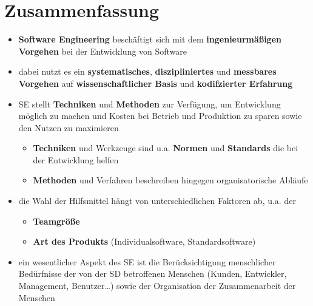\section{Zusammenfassung}

\begin{itemize}
    \item \textbf{Software Engineering} beschäftigt sich mit dem \textbf{ingenieurmäßigen Vorgehen} bei der Entwicklung von Software
    \item dabei nutzt es ein \textbf{systematisches}, \textbf{diszipliniertes} und \textbf{messbares Vorgehen} auf \textbf{wissenschaftlicher Basis} und \textbf{kodifzierter Erfahrung}
    \item SE stellt \textbf{Techniken} und \textbf{Methoden} zur Verfügung, um Entwicklung möglich zu machen und Kosten bei Betrieb und Produktion zu sparen sowie den Nutzen zu maximieren
        \begin{itemize}
            \item \textbf{Techniken} und Werkzeuge sind u.a. \textbf{Normen} und \textbf{Standards} die bei der Entwicklung helfen
            \item \textbf{Methoden} und Verfahren beschreiben hingegen organisatorische Abläufe
        \end{itemize}
    \item die Wahl der Hilfsmittel hängt von unterschiedlichen Faktoren ab, u.a. der
         \begin{itemize}
              \item \textbf{Teamgröße}
              \item \textbf{Art des Produkts} (Individualsoftware, Standardsoftware)
        \end{itemize}
    \item ein wesentlicher Aspekt des SE ist die Berücksichtigung menschlicher Bedürfnisse der von der SD betroffenen Menschen (Kunden, Entwickler, Management, Benutzer\ldots) sowie der Organisation der Zusammenarbeit der Menschen
\end{itemize}